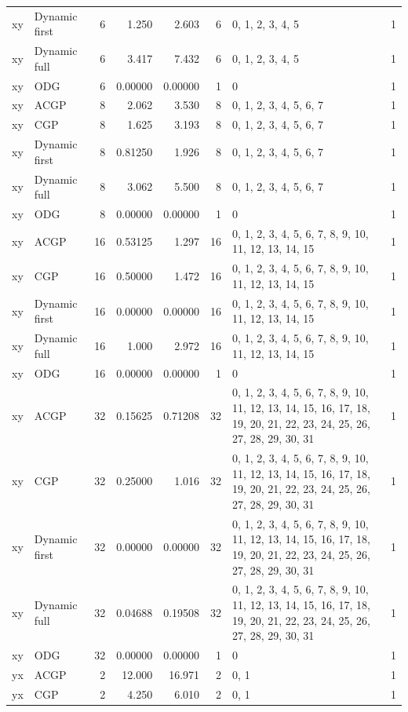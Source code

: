 \documentclass[10pt,a4paper]{article}
\begin{document}
\begin{longtable}{@{}p{23mm}p{29mm}rrrrp{36mm}r@{}}
xy & Dynamic first & 6 & 1.250 & 2.603 & 6 & 0, 1, 2, 3, 4, 5 & 1 \\
xy & Dynamic full & 6 & 3.417 & 7.432 & 6 & 0, 1, 2, 3, 4, 5 & 1 \\
xy & ODG & 6 & 0.00000 & 0.00000 & 1 & 0 & 1 \\
xy & ACGP & 8 & 2.062 & 3.530 & 8 & 0, 1, 2, 3, 4, 5, 6, 7 & 1 \\
xy & CGP & 8 & 1.625 & 3.193 & 8 & 0, 1, 2, 3, 4, 5, 6, 7 & 1 \\
xy & Dynamic first & 8 & 0.81250 & 1.926 & 8 & 0, 1, 2, 3, 4, 5, 6, 7 & 1 \\
xy & Dynamic full & 8 & 3.062 & 5.500 & 8 & 0, 1, 2, 3, 4, 5, 6, 7 & 1 \\
xy & ODG & 8 & 0.00000 & 0.00000 & 1 & 0 & 1 \\
xy & ACGP & 16 & 0.53125 & 1.297 & 16 & 0, 1, 2, 3, 4, 5, 6, 7, 8, 9, 10, 11, 12, 13, 14, 15 & 1 \\
xy & CGP & 16 & 0.50000 & 1.472 & 16 & 0, 1, 2, 3, 4, 5, 6, 7, 8, 9, 10, 11, 12, 13, 14, 15 & 1 \\
xy & Dynamic first & 16 & 0.00000 & 0.00000 & 16 & 0, 1, 2, 3, 4, 5, 6, 7, 8, 9, 10, 11, 12, 13, 14, 15 & 1 \\
xy & Dynamic full & 16 & 1.000 & 2.972 & 16 & 0, 1, 2, 3, 4, 5, 6, 7, 8, 9, 10, 11, 12, 13, 14, 15 & 1 \\
xy & ODG & 16 & 0.00000 & 0.00000 & 1 & 0 & 1 \\
xy & ACGP & 32 & 0.15625 & 0.71208 & 32 & 0, 1, 2, 3, 4, 5, 6, 7, 8, 9, 10, 11, 12, 13, 14, 15, 16, 17, 18, 19, 20, 21, 22, 23, 24, 25, 26, 27, 28, 29, 30, 31 & 1 \\
xy & CGP & 32 & 0.25000 & 1.016 & 32 & 0, 1, 2, 3, 4, 5, 6, 7, 8, 9, 10, 11, 12, 13, 14, 15, 16, 17, 18, 19, 20, 21, 22, 23, 24, 25, 26, 27, 28, 29, 30, 31 & 1 \\
xy & Dynamic first & 32 & 0.00000 & 0.00000 & 32 & 0, 1, 2, 3, 4, 5, 6, 7, 8, 9, 10, 11, 12, 13, 14, 15, 16, 17, 18, 19, 20, 21, 22, 23, 24, 25, 26, 27, 28, 29, 30, 31 & 1 \\
xy & Dynamic full & 32 & 0.04688 & 0.19508 & 32 & 0, 1, 2, 3, 4, 5, 6, 7, 8, 9, 10, 11, 12, 13, 14, 15, 16, 17, 18, 19, 20, 21, 22, 23, 24, 25, 26, 27, 28, 29, 30, 31 & 1 \\
xy & ODG & 32 & 0.00000 & 0.00000 & 1 & 0 & 1 \\
yx & ACGP & 2 & 12.000 & 16.971 & 2 & 0, 1 & 1 \\
yx & CGP & 2 & 4.250 & 6.010 & 2 & 0, 1 & 1 \\

\end{longtable}
\end{document}
